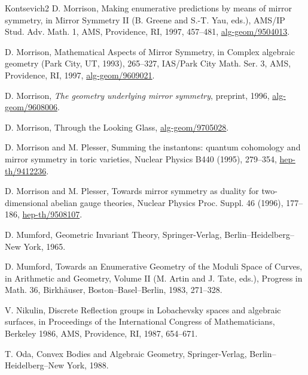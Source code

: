 \begin{thebibliography}{Kontsevich2}
\hypertarget{bib:Morrison6}{}
D. Morrison, Making enumerative predictions by means of mirror symmetry,
in Mirror Symmetry II (B. Greene and S.-T. Yau, eds.), AMS/IP Stud. Adv. Math. 1,
AMS, Providence, RI, 1997, 457--481, \href{https://arxiv.org/abs/alg-geom/9504013}{alg-geom/9504013}.

\hypertarget{bib:Morrison7}{}
D. Morrison, Mathematical Aspects of Mirror Symmetry, in Complex algebraic geometry (Park City, UT, 1993), 265--327, IAS/Park City Math. Ser. 3, AMS, Providence, RI, 1997, \href{https://arxiv.org/abs/alg-geom/9609021}{alg-geom/9609021}.

\hypertarget{bib:Morrison8}{} D. Morrison, \emph{The geometry underlying mirror symmetry}, preprint, 1996, \href{https://arxiv.org/abs/alg-geom/9608006}{alg-geom/9608006}.

\hypertarget{bib:Morrison9}{}
D. Morrison, Through the Looking Glass, \href{https://arxiv.org/abs/alg-geom/9705028}{alg-geom/9705028}.

\hypertarget{bib:MP1}{}
D. Morrison and M. Plesser,
Summing the instantons: quantum cohomology and mirror symmetry in toric varieties,
Nuclear Physics B440 (1995), 279--354, \href{https://arxiv.org/abs/hep-th/9412236}{hep-th/9412236}.

\hypertarget{bib:MP2}{}
D. Morrison and M. Plesser, Towards mirror symmetry as duality for two-dimensional
abelian gauge theories, Nuclear Physics Proc. Suppl. 46 (1996),
177--186, \href{https://arxiv.org/abs/hep-th/9508107}{hep-th/9508107}.

\hypertarget{bib:Mumford1}{}
D. Mumford, Geometric Invariant Theory, Springer-Verlag, Berlin--Heidelberg--New York, 1965.

\hypertarget{bib:Mumford2}{}
D. Mumford, Towards an Enumerative Geometry of the Moduli Space of Curves, in Arithmetic and Geometry, Volume II (M. Artin and J. Tate, eds.), Progress in Math. 36, Birkhäuser, Boston--Basel--Berlin, 1983, 271--328.


\hypertarget{bib:Nikulin}{}
V. Nikulin, Discrete Reflection groups in Lobachevsky spaces and algebraic surfaces,
in Proceedings of the International Congress of Mathematicians, Berkeley 1986,
AMS, Providence, RI, 1987, 654--671.

\hypertarget{bib:Oda}{}
T. Oda, Convex Bodies and Algebraic Geometry,
Springer-Verlag, Berlin--Heidelberg--New York, 1988.


\end{thebibliography}
